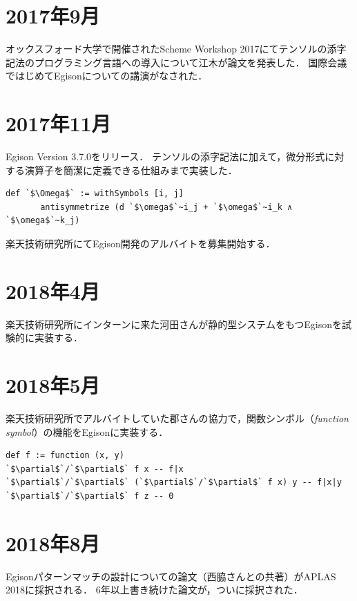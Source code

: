 \section*{2017年9月}

オックスフォード大学で開催されたScheme Workshop 2017にてテンソルの添字記法のプログラミング言語への導入について江木が論文を発表した．
国際会議ではじめてEgisonについての講演がなされた．

\section*{2017年11月}

Egison Version 3.7.0をリリース．
テンソルの添字記法に加えて，微分形式に対する演算子を簡潔に定義できる仕組みまで実装した．
\begin{lstlisting}[language=egison,numbers=none]
def `$\Omega$` := withSymbols [i, j]
       antisymmetrize (d `$\omega$`~i_j + `$\omega$`~i_k ∧ `$\omega$`~k_j)
\end{lstlisting}

楽天技術研究所にてEgison開発のアルバイトを募集開始する．

\section*{2018年4月}

楽天技術研究所にインターンに来た河田さんが静的型システムをもつEgisonを試験的に実装する．

\section*{2018年5月}

楽天技術研究所でアルバイトしていた郡さんの協力で，関数シンボル（\emph{function symbol}）の機能をEgisonに実装する．
\begin{lstlisting}[language=egison,numbers=none]
def f := function (x, y)
`$\partial$`/`$\partial$` f x -- f|x
`$\partial$`/`$\partial$` (`$\partial$`/`$\partial$` f x) y -- f|x|y
`$\partial$`/`$\partial$` f z -- 0
\end{lstlisting}

\section*{2018年8月}

Egisonパターンマッチの設計についての論文（西脇さんとの共著）がAPLAS 2018に採択される．
6年以上書き続けた論文が，ついに採択された．

